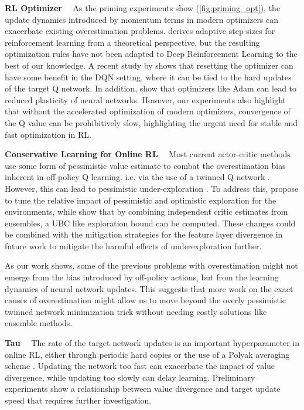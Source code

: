 {\bf RL Optimizer}~~ As the priming experiments show (\autoref{fig:priming_opt}), the update dynamics introduced by momentum terms in modern optimizers can exacerbate existing overestimation problems. 
\textcite{dabney2014adaptive} derives adaptive step-sizes for reinforcement learning from a theoretical perspective, but the resulting optimization rules have not been adapted to Deep Reinforcement Learning to the best of our knowledge.
A recent study by \textcite{asadi2023resetting} shows that resetting the optimizer can have some benefit in the DQN setting, where it can be tied to the hard updates of the target Q network.
In addition, \textcite{lyle2023understanding} show that optimizers like Adam can lead to reduced plasticity of neural networks.
However, our experiments also highlight that without the accelerated optimization of modern optimizers, convergence of the Q value can be prohibitively slow, highlighting the urgent need for stable and fast optimization in RL.

{\bf Conservative Learning for Online RL}~~ Most current actor-critic methods use some form of pessimistic value estimate to combat the overestimation bias inherent in off-policy Q learning. i.e. via the use of a twinned Q network \parencite{fujimoto2018addressing}.
However, this can lead to pessimistic under-exploration \parencite{lan2020maxmin}.
To address this, \textcite{moskovitz2021tactical} propose to tune the relative impact of pessimistic and optimistic exploration for the environments, while \textcite{lee2021sunrise} show that by combining independent critic estimates from ensembles, a UBC like exploration bound can be computed.
These changes could be combined with the mitigation strategies for the feature layer divergence in future work to mitigate the harmful effects of underexploration further.

As our work shows, some of the previous problems with overestimation might not emerge from the bias introduced by off-policy actions, but from the learning dynamics of neural network updates.
This suggests that more work on the exact causes of overestimation might allow us to move beyond the overly pessimistic twinned network minimization trick without needing costly solutions like ensemble methods.

{\bf Tau}~~ The rate of the target network updates is an important hyperparameter in online RL, either through periodic hard copies \parencite{mnih2013playing} or the use of a Polyak averaging scheme \parencite{lillicrap2016ddpg}.
Updating the network too fast can exacerbate the impact of value divergence, while updating too slowly can delay learning. Preliminary experiments show a relationship between value divergence and target update speed that requires further investigation.

